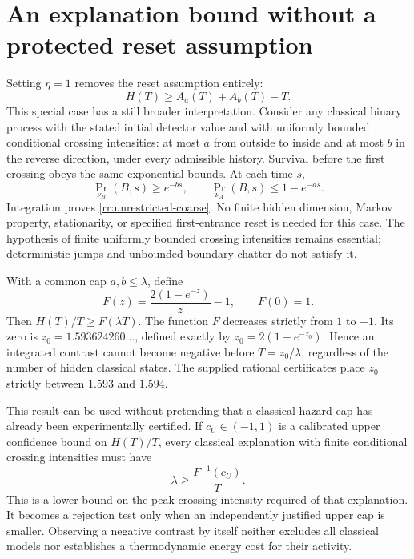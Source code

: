 \section{An explanation bound without a protected reset assumption}

Setting $\eta=1$ removes the reset assumption entirely:
\begin{equation}
 H(T)\geq A_a(T)+A_b(T)-T.
 \label{rr:unrestricted-coarse}
\end{equation}
This special case has a still broader interpretation. Consider any classical
binary process with the stated initial detector value and with uniformly bounded
conditional crossing intensities: at most $a$ from outside to inside and at most
$b$ in the reverse direction, under every admissible history. Survival before
the first crossing obeys the same exponential bounds. At each time $s$,
\[
 \Pr_{\nu_B}(B,s)\geq e^{-bs},\qquad
 \Pr_{\nu_A}(B,s)\leq1-e^{-as}.
\]
Integration proves \eqref{rr:unrestricted-coarse}. No finite hidden dimension,
Markov property, stationarity, or specified first-entrance reset is needed for
this case. The hypothesis of finite uniformly bounded crossing intensities
remains essential; deterministic jumps and unbounded boundary chatter do not
satisfy it.

With a common cap $a,b\leq\lambda$, define
\[
 F(z)=\frac{2(1-e^{-z})}{z}-1,\qquad F(0)=1.
\]
Then $H(T)/T\geq F(\lambda T)$. The function $F$ decreases strictly from $1$
to $-1$. Its zero is $z_0=1.593624260\ldots$, defined exactly by
$z_0=2(1-e^{-z_0})$. Hence an integrated contrast cannot become negative before
$T=z_0/\lambda$, regardless of the number of hidden classical states. The
supplied rational certificates place $z_0$ strictly between $1.593$ and $1.594$.

This result can be used without pretending that a classical hazard cap has
already been experimentally certified. If $c_U\in(-1,1)$ is a calibrated upper
confidence bound on $H(T)/T$, every classical explanation with finite conditional
crossing intensities must have
\begin{equation}
 \lambda\geq\frac{F^{-1}(c_U)}{T}.
 \label{rr:activity-inverse}
\end{equation}
This is a lower bound on the peak crossing intensity required of that explanation.
It becomes a rejection test only when an independently justified upper cap is
smaller. Observing a negative contrast by itself neither excludes all classical
models nor establishes a thermodynamic energy cost for their activity.


